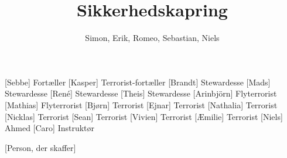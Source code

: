 \documentclass[a4paper,11pt]{article}
\title{Sikkerhedskapring}
\author{Simon, Erik, Romeo, Sebastian, Niels}
\begin{document}
\maketitle

\begin{roles}
[Sebbe] Fortæller
[Kasper] Terrorist-fortæller
[Brandt] Stewardesse
[Mads] Stewardesse
[René] Stewardesse
[Theis] Stewardesse
[Arinbjörn] Flyterrorist
[Mathias] Flyterrorist
[Bjørn] Terrorist
[Ejnar] Terrorist
[Nathalia] Terrorist
[Nicklas] Terrorist
[Sean] Terrorist
[Vivien] Terrorist
[Æmilie] Terrorist
[Niels] Ahmed
[Caro] Instruktør
\end{roles}

\begin{props}
[Person, der skaffer]
\end{props}
\end{document}
